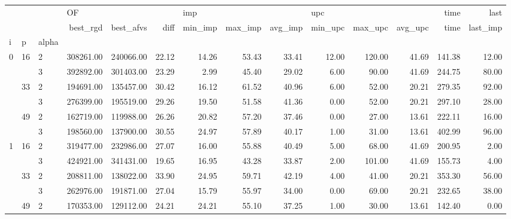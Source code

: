\begin{tabular}{lllrrrrrrrrrrr}
\toprule
  &    &   & \multicolumn{3}{l}{OF} & \multicolumn{3}{l}{imp} & \multicolumn{3}{l}{upc} &   time &     last \\
  &    &   &  best\_rgd & best\_afvs &  diff & min\_imp & max\_imp & avg\_imp & min\_upc & max\_upc & avg\_upc &   time & last\_imp \\
i & p & alpha &           &           &       &         &         &         &         &         &         &        &          \\
\midrule
\multirow{6}{*}{0} & \multirow{2}{*}{16} & 2 & 308261.00 & 240066.00 & 22.12 &   14.26 &   53.43 &   33.41 &   12.00 &  120.00 &   41.69 & 141.38 &    12.00 \\
  &    & 3 & 392892.00 & 301403.00 & 23.29 &    2.99 &   45.40 &   29.02 &    6.00 &   90.00 &   41.69 & 244.75 &    80.00 \\
\cline{2-14}
  & \multirow{2}{*}{33} & 2 & 194691.00 & 135457.00 & 30.42 &   16.12 &   61.52 &   40.96 &    6.00 &   52.00 &   20.21 & 279.35 &    92.00 \\
  &    & 3 & 276399.00 & 195519.00 & 29.26 &   19.50 &   51.58 &   41.36 &    0.00 &   52.00 &   20.21 & 297.10 &    28.00 \\
\cline{2-14}
  & \multirow{2}{*}{49} & 2 & 162719.00 & 119988.00 & 26.26 &   20.82 &   57.20 &   37.46 &    0.00 &   27.00 &   13.61 & 222.11 &    16.00 \\
  &    & 3 & 198560.00 & 137900.00 & 30.55 &   24.97 &   57.89 &   40.17 &    1.00 &   31.00 &   13.61 & 402.99 &    96.00 \\
\cline{1-14}
\cline{2-14}
\multirow{6}{*}{1} & \multirow{2}{*}{16} & 2 & 319477.00 & 232986.00 & 27.07 &   16.00 &   55.88 &   40.49 &    5.00 &   68.00 &   41.69 & 200.95 &     2.00 \\
  &    & 3 & 424921.00 & 341431.00 & 19.65 &   16.95 &   43.28 &   33.87 &    2.00 &  101.00 &   41.69 & 155.73 &     4.00 \\
\cline{2-14}
  & \multirow{2}{*}{33} & 2 & 208811.00 & 138022.00 & 33.90 &   24.95 &   59.71 &   42.19 &    4.00 &   41.00 &   20.21 & 353.30 &    56.00 \\
  &    & 3 & 262976.00 & 191871.00 & 27.04 &   15.79 &   55.97 &   34.00 &    0.00 &   69.00 &   20.21 & 232.65 &    38.00 \\
\cline{2-14}
  & \multirow{2}{*}{49} & 2 & 170353.00 & 129112.00 & 24.21 &   24.21 &   55.10 &   37.25 &    1.00 &   30.00 &   13.61 & 142.40 &     0.00 \\

\end{tabular}
